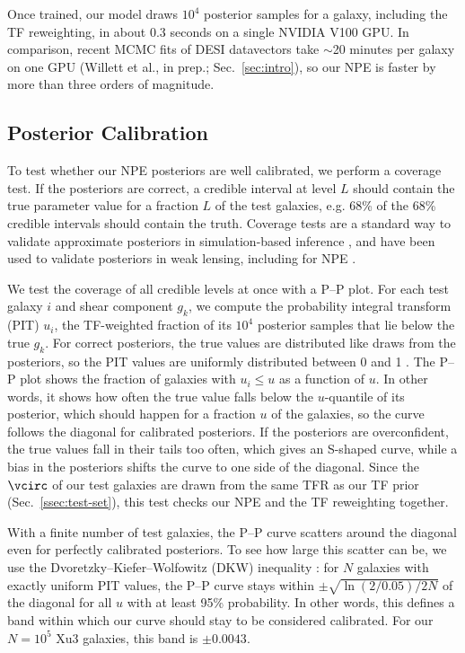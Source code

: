 Once trained, our model draws $10^4$ posterior samples for a galaxy, including the TF reweighting, in about 0.3 seconds on a single NVIDIA V100 GPU. In comparison, recent MCMC fits of DESI datavectors take $\sim$20 minutes per galaxy on one GPU (Willett et al., in prep.; Sec.~\ref{sec:intro}), so our NPE is faster by more than three orders of magnitude.

\subsection{Posterior Calibration}
\label{ssec:calibration}

To test whether our NPE posteriors are well calibrated, we perform a coverage test. If the posteriors are correct, a credible interval at level $L$ should contain the true parameter value for a fraction $L$ of the test galaxies, e.g. 68\% of the 68\% credible intervals should contain the truth. Coverage tests are a standard way to validate approximate posteriors in simulation-based inference \citep{TrustCrisis}, and have been used to validate posteriors in weak lensing, including for NPE \citep{FieldLevelWL, NPEShear}.

We test the coverage of all credible levels at once with a P--P plot. For each test galaxy $i$ and shear component $g_k$, we compute the probability integral transform (PIT) $u_i$, the TF-weighted fraction of its $10^4$ posterior samples that lie below the true $g_k$. For correct posteriors, the true values are distributed like draws from the posteriors, so the PIT values are uniformly distributed between 0 and 1 \citep{CookGelmanRubin06, SBC}. The P--P plot shows the fraction of galaxies with $u_i \leq u$ as a function of $u$. In other words, it shows how often the true value falls below the $u$-quantile of its posterior, which should happen for a fraction $u$ of the galaxies, so the curve follows the diagonal for calibrated posteriors. If the posteriors are overconfident, the true values fall in their tails too often, which gives an S-shaped curve, while a bias in the posteriors shifts the curve to one side of the diagonal. Since the $\vcirc$ of our test galaxies are drawn from the same TFR as our TF prior (Sec.~\ref{ssec:test-set}), this test checks our NPE and the TF reweighting together.

With a finite number of test galaxies, the P--P curve scatters around the diagonal even for perfectly calibrated posteriors. To see how large this scatter can be, we use the Dvoretzky--Kiefer--Wolfowitz (DKW) inequality \citep{DKW56, Massart90}: for $N$ galaxies with exactly uniform PIT values, the P--P curve stays within $\pm\sqrt{\ln(2/0.05)/2N}$ of the diagonal for all $u$ with at least 95\% probability. In other words, this defines a band within which our curve should stay to be considered calibrated. For our $N=10^5$ Xu3 galaxies, this band is $\pm 0.0043$.

